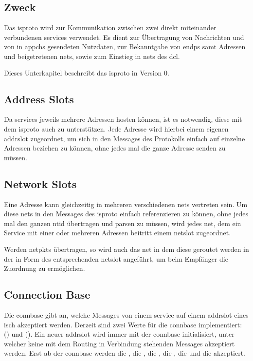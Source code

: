
\subsection{Zweck}
Das \gls{isproto} wird zur Kommunikation zwischen zwei direkt miteinander verbundenen \glspl{service}
verwendet. Es dient zur Übertragung von Nachrichten und von in \glspl{appch} gesendeten Nutzdaten,
zur Bekanntgabe von \glspl{endp} samt Adressen und beigetretenen \glspl{net}, sowie zum Einstieg in
\glspl{net} des \gls{dcl}.

Dieses Unterkapitel beschreibt das \gls{isproto} in Version 0.

\subsection{Address Slots}
Da \glspl{service} jeweils mehrere Adressen hosten können, ist es notwendig, diese mit dem
\gls{isproto} auch zu unterstützen. Jede Adresse wird hierbei einem eigenen \gls{addrslot} zugeordnet,
um sich in den Messages des Protokolls einfach auf einzelne Adressen beziehen zu können, ohne jedes
mal die ganze Adresse senden zu müssen.

\subsection{Network Slots}
Eine Adresse kann gleichzeitig in mehreren verschiedenen \glspl{net} vertreten sein. Um diese
\glspl{net} in den Messages des \gls{isproto} einfach referenzieren zu können, ohne jedes mal den
ganzen \gls{ntid} übertragen und parsen zu müssen, wird jedes \gls{net}, dem ein Service mit einer
oder mehreren Adressen beitritt einem \gls{netslot} zugeordnet.

Werden \glspl{netpkt} übertragen, so wird auch das \gls{net} in dem diese geroutet werden in der
\msg{\isprotonp} in Form des entsprechenden \gls{netslot} angeführt, um beim Empfänger die Zuordnung
zu ermöglichen.

\subsection{Connection Base}
Die \gls{connbase} gibt an, welche Messages von einem \gls{service} auf einem \gls{addrslot} eines
\gls{isch} akzeptiert werden. Derzeit sind zwei Werte für die \gls{connbase} implementiert:
 () und  ().
Ein neuer \gls{addrslot} wird immer mit der \gls{connbase}  initialisiert, unter
welcher keine mit dem Routing in Verbindung stehenden Messages akzeptiert werden.
Erst ab der \gls{connbase}  werden die \msg{\isprotonjn}, die \msg{\isprotonln},
die \msg{\isprotonp}, die \msg{\isprotoireq}, die \msg{\isprotoacsa} und die \msg{\isprotoacd}
akzeptiert.

